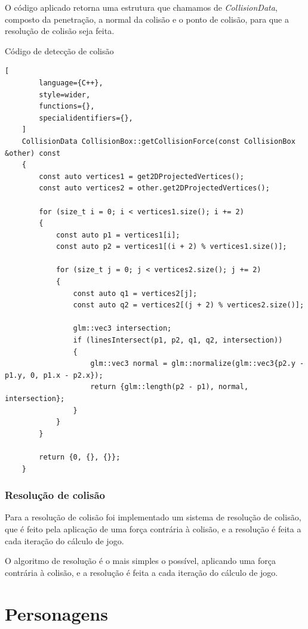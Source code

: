 O código aplicado retorna uma estrutura que chamamos de \textit{CollisionData}, composto da penetração, a normal da colisão e o ponto de colisão, para que a resolução de colisão seja feita.

\pagebreak
\begin{programruledcaption}{Código de detecção de colisão}
    \begin{lstlisting}[
        language={C++},
        style=wider,
        functions={},
        specialidentifiers={},
    ]
    CollisionData CollisionBox::getCollisionForce(const CollisionBox &other) const
    {
        const auto vertices1 = get2DProjectedVertices();
        const auto vertices2 = other.get2DProjectedVertices();

        for (size_t i = 0; i < vertices1.size(); i += 2)
        {
            const auto p1 = vertices1[i];
            const auto p2 = vertices1[(i + 2) % vertices1.size()];

            for (size_t j = 0; j < vertices2.size(); j += 2)
            {
                const auto q1 = vertices2[j];
                const auto q2 = vertices2[(j + 2) % vertices2.size()];

                glm::vec3 intersection;
                if (linesIntersect(p1, p2, q1, q2, intersection))
                {
                    glm::vec3 normal = glm::normalize(glm::vec3{p2.y - p1.y, 0, p1.x - p2.x});
                    return {glm::length(p2 - p1), normal, intersection};
                }
            }
        }

        return {0, {}, {}};
    }
    \end{lstlisting}
\end{programruledcaption}


\subsubsection{Resolução de colisão}

Para a resolução de colisão foi implementado um sistema de resolução de colisão, que é feito pela aplicação de uma força contrária à colisão, e a resolução é feita a cada iteração do cálculo de jogo.

O algoritmo de resolução é o mais simples o possível, aplicando uma força contrária à colisão, e a resolução é feita a cada iteração do cálculo de jogo.

\section{Personagens}

